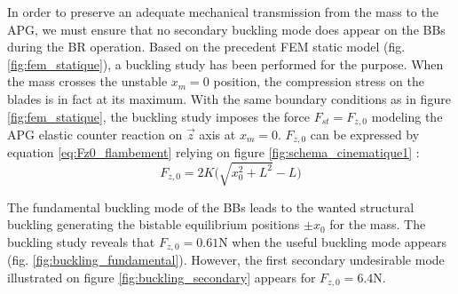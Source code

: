 \documentclass[3p,twocolumn,preprint]{elsarticle}
\begin{document}
In order to preserve an adequate mechanical transmission from the mass to the APG, we must ensure that no secondary buckling mode does appear on the BBs during the BR operation. Based on the precedent FEM static model (fig. \ref{fig:fem_statique}), a buckling study has been performed for the purpose. When the mass crosses the unstable \mbox{$x_m=0$} position, the compression stress on the blades is in fact at its maximum. With the same boundary conditions as in figure \ref{fig:fem_statique}, the buckling study imposes the force $F_{st} = F_{z,0}$ modeling the APG elastic counter reaction on $\vec{z}$ axis at $x_m = 0$. $F_{z,0}$ can be expressed by equation \ref{eq:Fz0_flambement} relying on figure \ref{fig:schema_cinematique1} :
\begin{equation}
	F_{z,0} = 2K \biggl( \sqrt{x_0^2+L^2}-L \biggr)
	\label{eq:Fz0_flambement}
\end{equation}

The fundamental buckling mode of the BBs leads to the wanted structural buckling generating the bistable equilibrium positions $\pm x_0$ for the mass. The buckling study reveals that $F_{z,0}=0.61$N when the useful buckling mode appears (fig. \ref{fig:buckling_fundamental}). However, the first secondary undesirable mode illustrated on figure \ref{fig:buckling_secondary} appears for $F_{z,0}=6.4$N. 
\end{document}
